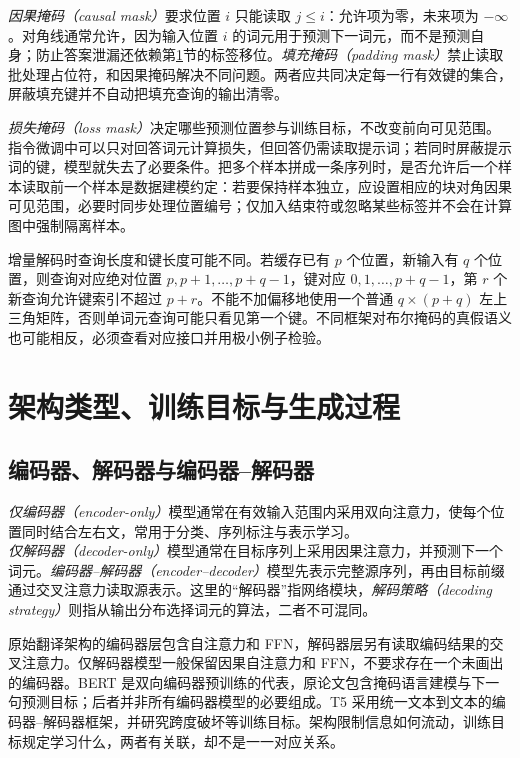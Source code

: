 \documentclass[UTF8,12pt,a4paper,fontset=fandol]{ctexart}
\begin{document}
\emph{因果掩码（causal mask）}要求位置 $i$ 只能读取 $j\le i$：允许项为零，未来项为 $-\infty$。对角线通常允许，因为输入位置 $i$ 的词元用于预测下一词元，而不是预测自身；防止答案泄漏还依赖第\ref{sec:tr-training}节的标签移位。\emph{填充掩码（padding mask）}禁止读取批处理占位符，和因果掩码解决不同问题。两者应共同决定每一行有效键的集合，屏蔽填充键并不自动把填充查询的输出清零。

\emph{损失掩码（loss mask）}决定哪些预测位置参与训练目标，不改变前向可见范围。指令微调中可以只对回答词元计算损失，但回答仍需读取提示词；若同时屏蔽提示词的键，模型就失去了必要条件。把多个样本拼成一条序列时，是否允许后一个样本读取前一个样本是数据建模约定：若要保持样本独立，应设置相应的块对角因果可见范围，必要时同步处理位置编号；仅加入结束符或忽略某些标签并不会在计算图中强制隔离样本。

增量解码时查询长度和键长度可能不同。若缓存已有 $p$ 个位置，新输入有 $q$ 个位置，则查询对应绝对位置 $p,p+1,\ldots,p+q-1$，键对应 $0,1,\ldots,p+q-1$，第 $r$ 个新查询允许键索引不超过 $p+r$。不能不加偏移地使用一个普通 $q\times(p+q)$ 左上三角矩阵，否则单词元查询可能只看见第一个键。不同框架对布尔掩码的真假语义也可能相反，必须查看对应接口并用极小例子检验。

\section{架构类型、训练目标与生成过程}
\label{sec:tr-training}

\subsection{编码器、解码器与编码器--解码器}

\emph{仅编码器（encoder-only）}模型通常在有效输入范围内采用双向注意力，使每个位置同时结合左右文，常用于分类、序列标注与表示学习。\emph{仅解码器（decoder-only）}模型通常在目标序列上采用因果注意力，并预测下一个词元。\emph{编码器--解码器（encoder--decoder）}模型先表示完整源序列，再由目标前缀通过交叉注意力读取源表示。这里的“解码器”指网络模块，\emph{解码策略（decoding strategy）}则指从输出分布选择词元的算法，二者不可混同。

原始翻译架构的编码器层包含自注意力和 FFN，解码器层另有读取编码结果的交叉注意力。仅解码器模型一般保留因果自注意力和 FFN，不要求存在一个未画出的编码器。BERT 是双向编码器预训练的代表，原论文包含掩码语言建模与下一句预测目标\cite{devlin2019}；后者并非所有编码器模型的必要组成。T5 采用统一文本到文本的编码器--解码器框架，并研究跨度破坏等训练目标\cite{raffel2020}。架构限制信息如何流动，训练目标规定学习什么，两者有关联，却不是一一对应关系。
\end{document}
